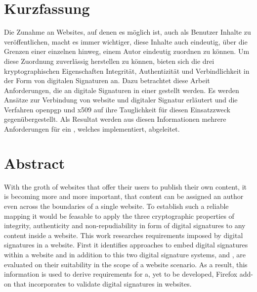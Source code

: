 

\noindent
\begin{minipage}{\textwidth}
\chapter*{Kurzfassung}
Die Zunahme an Websites, auf denen es möglich ist, auch als Benutzer Inhalte zu veröffentlichen, macht es immer wichtiger, diese Inhalte auch eindeutig, über
die Grenzen einer einzelnen  hinweg, einem Autor eindeutig zuordnen zu können. Um diese Zuordnung zuverlässig herstellen zu können, bieten
sich die drei kryptographischen Eigenschaften Integrität, Authentizität und Verbindlichkeit in der Form von digitalen Signaturen an. Dazu betrachtet diese
Arbeit Anforderungen, die an digitale Signaturen in einer  gestellt werden. Es werden Ansätze zur Verbindung von \gls{website} und digitaler
Signatur erläutert und die Verfahren \gls{openpgp} und \gls{x509} auf ihre Tauglichkeit für diesen Einsatzzweck gegenübergestellt. Als Resultat werden aus
diesen Informationen mehrere Anforderungen für ein , welches  implementiert, abgeleitet.

\chapter*{Abstract}
With the groth of websites that offer their users to publish their own content, it is becoming more and more important, that content can be assigned an
author even across the boundaries of a single website. To establish such a reliable mapping it would be feasable to apply the three cryptographic
properties of integrity, authenticity and non-repudiability in form of digital signatures to any content inside a website. This work researches requirements
imposed by digital signatures in a website. First it identifies approaches to embed digital signatures within a website and in addition to this two digital
signature systems,  and , are evaluated on their suitability in the scope of a website scenario. As a result, this information
is used to derive requirements for a, yet to be developed, Firefox add-on that incorporates  to validate digital signatures in websites.

\end{minipage}
